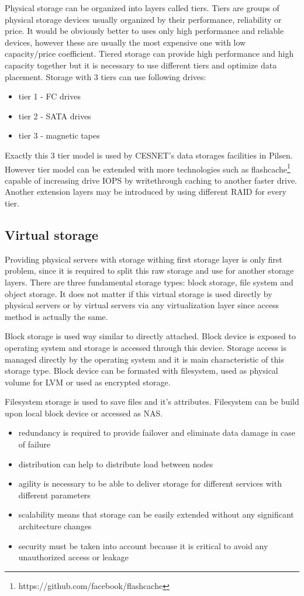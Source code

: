Physical storage can be organized into layers called tiers. Tiers are groups of physical storage devices usually organized by their performance, reliability or price. It would be obviously better to uses only high performance and reliable devices, however these are usually the most expensive one with low capacity/price coefficient. Tiered storage can provide high performance and high capacity together but it is necessary to use different tiers and optimize data placement. Storage with 3 tiers can use following drives:
\begin{itemize}
	\item tier 1 - \Ac{FC} drives
	\item tier 2 - \Ac{SATA} drives
	\item tier 3 - magnetic tapes
\end{itemize}
Exactly this 3 tier model is used by CESNET's data storages facilities in Pilsen. However tier model can be extended with more technologies such as flashcache\footnote{https://github.com/facebook/flashcache} capable of increasing drive \Ac{IOPS} by writethrough caching to another faster drive. Another extension layers may be introduced by using different \Ac{RAID} for every tier.


\subsection{Virtual storage}
Providing physical servers with storage withing first storage layer is only first problem, since it is required to split this raw storage and use for another storage layers. There are three fundamental storage types: block storage, file system and object storage. It does not matter if this virtual storage is used directly by physical servers or by virtual servers via any virtualization layer since access method is actually the same.

Block storage is used way similar to directly attached. Block device is exposed to operating system and storage is accessed through this device. Storage access is managed directly by the operating system and it is main characteristic of this storage type. Block device can be formated with filesystem, used as physical volume for \Ac{LVM} or used as encrypted storage.

Filesystem storage is used to save files and it's attributes. Filesystem can be build upon local block device or accessed as \Ac{NAS}.


\begin{itemize}
	\item redundancy is required to provide failover and eliminate data damage in case of failure 
	\item distribution can help to distribute load between nodes
	\item agility is necessary to be able to deliver storage for different services with different parameters
	\item scalability means that storage can be easily extended without any significant architecture changes
	\item security must be taken into account because it is critical to avoid any unauthorized access or leakage
\end{itemize}

